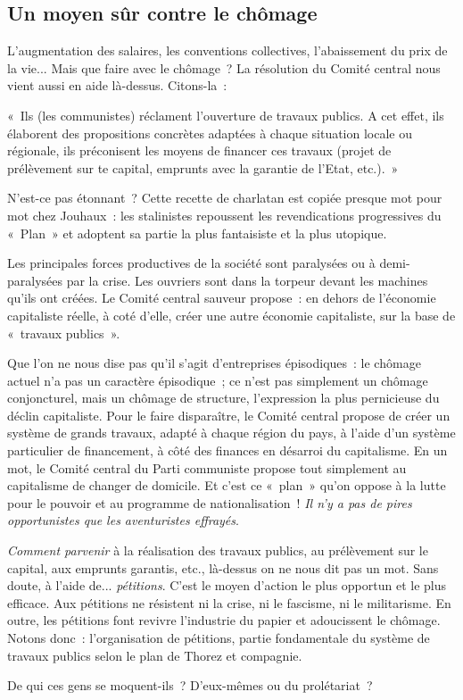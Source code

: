 \documentclass[french,twoside]{book} %
\newenvironment{quoteblock}%
  {\begin{quoting}}
  {\end{quoting}}
\newenvironment{quotebar}{%
    \def\FrameCommand{{\color{rubric!10!}\vrule width 0.5em} \hspace{0.9em}}%
    \def\OuterFrameSep{\itemsep} %
    \MakeFramed {\advance\hsize-\width \FrameRestore}
  }%
  {%
    \endMakeFramed
  }
\renewenvironment{quoteblock}%
  {%
    \savenotes
    \setstretch{0.9}
    \normalfont
    \begin{quotebar}
  }
  {%
    \end{quotebar}
    \spewnotes
  }
\begin{document}
\subsection[{Un moyen sûr contre le chômage}]{Un moyen sûr contre le chômage}
\noindent L’augmentation des salaires, les conventions collectives, l’abaissement du prix de la vie... Mais que faire avec le chômage ? La résolution du Comité central nous vient aussi en aide là-dessus. Citons-la :\par

\begin{quoteblock}
 \noindent « Ils (les communistes) réclament l’ouverture de travaux publics. A cet effet, ils élaborent des propositions concrètes adaptées à chaque situation locale ou régionale, ils préconisent les moyens de financer ces travaux (projet de prélèvement sur te capital, emprunts avec la garantie de l’Etat, etc.). »
 \end{quoteblock}

\noindent N’est-ce pas étonnant ? Cette recette de charlatan est copiée presque mot pour mot chez Jouhaux : les stalinistes  repoussent les revendications progressives du « Plan » et adoptent sa partie la plus fantaisiste et la plus utopique.\par
Les principales forces productives de la société sont paralysées ou à demi-paralysées par la crise. Les ouvriers sont dans la torpeur devant les machines qu’ils ont créées. Le Comité central sauveur propose : en dehors de l’économie capitaliste réelle, à coté d’elle, créer une autre économie capitaliste, sur la base de « travaux publics ».\par
Que l’on ne nous dise pas qu’il s’agit d’entreprises épisodiques : le chômage actuel n’a pas un caractère épisodique ; ce n’est pas simplement un chômage conjoncturel, mais un chômage de structure, l’expression la plus pernicieuse du déclin capitaliste. Pour le faire disparaître, le Comité central propose de créer un système de grands travaux, adapté à chaque région du pays, à l’aide d’un système particulier de financement, à côté des finances en désarroi du capitalisme. En un mot, le Comité central du Parti communiste propose tout simplement au capitalisme de changer de domicile. Et c’est ce « plan » qu’on oppose à la lutte pour le pouvoir et au programme de nationalisation ! \emph{Il n’y a pas de pires opportunistes que les aventuristes effrayés}.\par
\emph{Comment parvenir} à la réalisation des travaux publics, au prélèvement sur le capital, aux emprunts garantis, etc., là-dessus on ne nous dit pas un mot. Sans doute, à l’aide de... \emph{pétitions}. C’est le moyen d’action le plus opportun et le plus efficace. Aux pétitions ne résistent ni la crise, ni le fascisme, ni le militarisme. En outre, les pétitions font revivre l’industrie du papier et adoucissent le chômage. Notons donc : l’organisation de pétitions, partie fondamentale du système de travaux publics selon le plan de Thorez et compagnie.\par
De qui ces gens se moquent-ils ? D’eux-mêmes ou du prolétariat ?
\end{document}
